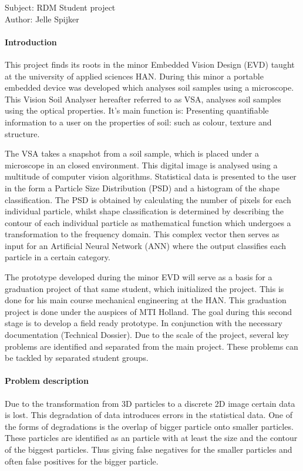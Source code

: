 Subject: RDM Student project\\
Author: Jelle Spijker\\

\paragraph{Introduction}
This project finds its roots in the minor Embedded Vision Design (EVD) taught at the university of applied sciences HAN. During this minor a portable embedded device was developed which analyses soil samples using a microscope. This Vision Soil Analyser hereafter referred to as VSA, analyses soil samples using the optical properties. It’s main function is: Presenting quantifiable information to a user on the properties of soil: such as colour, texture and structure.

The VSA takes a snapshot from a soil sample, which is placed under a microscope in an closed environment. This digital image is analysed using a multitude of computer vision algorithms. Statistical data is presented to the user in the form a Particle Size Distribution (PSD) and a histogram of the shape classification. The PSD is obtained by calculating the number of pixels for each individual particle, whilst shape classification is determined by describing the contour of each individual particle as mathematical function which undergoes a transformation to the frequency domain. This complex vector then serves as input for an Artificial Neural Network (ANN) where the output classifies each particle in a certain category.

The prototype developed during the minor EVD will serve as a basis for a graduation project of that same student, which initialized the project. This is done for his main course mechanical engineering at the HAN. This graduation project is done under the auspices of MTI Holland. The goal during this second stage is to develop a field ready prototype. In conjunction with the necessary documentation (Technical Dossier). 
Due to the scale of the project, several key problems are identified and separated from the main project. These problems can be tackled by separated student groups.

\paragraph{Problem description}
Due to the transformation from 3D particles to a discrete 2D image certain data is lost. This degradation of data introduces errors in the statistical data. One of the forms of degradations is the overlap of bigger particle onto smaller particles. These particles are identified as an particle with at least the size and the contour of the biggest particles. Thus giving false negatives for the smaller particles and often false positives for the bigger particle.

